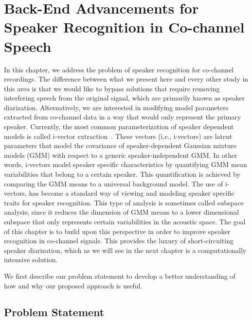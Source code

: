 
\chapter{Back-End Advancements for Speaker Recognition in Co-channel Speech}

In this chapter, we address the problem of speaker recognition for co-channel recordings. 
The difference between what we present here and every other study in this area is that we would like to bypass solutions that require removing interfering speech from the original signal, which are primarily known as speaker diarization. 
Alternatively, we are interested in modifying model parameters extracted from co-channel data in a way that would only represent the primary speaker. 
Currently, the most common parameterization of speaker dependent models is called i-vector extraction~\cite{najeem_frontendanalysis}. 
These vectors (i.e., i-vectors) are latent parameters that model the covariance of speaker-dependent Gaussian mixture models (GMM) with respect to a generic speaker-independent GMM. 
In other words, i-vectors model speaker specific characteristics by quantifying GMM mean variabilities that belong to a certain speaker. This quantification is achieved by comparing the GMM means to a universal background model. 
The use of i-vectors, has become a standard way of viewing and modeling speaker specific traits for speaker recognition. 
This type of analysis is sometimes called subspace analysis; since it reduces the dimension of GMM means to a lower dimensional subspace that only represents certain variabilities in the acoustic space. 
The goal of this chapter is to build upon this perspective in order to improve speaker recognition in co-channel signals. 
This provides the luxury of short-circuiting speaker diarization, which as we will see in the next chapter is a computationally intensive solution. 

We first describe our problem statement to develop a better understanding of how and why our proposed approach is useful. 

\section{Problem Statement}

